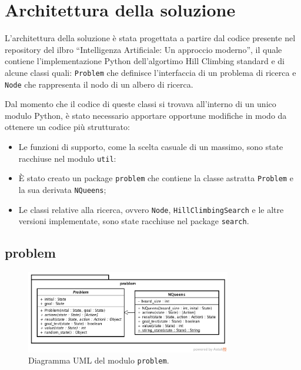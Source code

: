 \clearpage
\section{Architettura della soluzione}

L'architettura della soluzione è stata progettata a partire dal codice presente nel repository del ilbro ``Intelligenza Artificiale: Un approccio moderno'', il quale contiene l'implementazione Python dell'algortimo Hill Climbing standard e di alcune classi quali: \texttt{Problem} che definisce l'interfaccia di un problema di ricerca e \texttt{Node} che rappresenta il nodo di un albero di ricerca.

Dal momento che il codice di queste classi si trovava all'interno di un unico modulo Python, è stato necessario apportare opportune modifiche in modo da ottenere un codice più strutturato:

\begin{itemize}
\item Le funzioni di supporto, come la scelta casuale di un massimo, sono state racchiuse nel modulo \texttt{util}:
\item \`{E} stato creato un package \texttt{problem} che contiene la classe astratta \texttt{Problem} e la sua derivata \texttt{NQueens};
\item Le classi relative alla ricerca, ovvero \texttt{Node}, \texttt{HillClimbingSearch} e le altre versioni implementate, sono state racchiuse nel package \texttt{search}.
\end{itemize}

\subsection{problem}

\begin{figure}[ht]
\centering
\includegraphics[width=0.8\textwidth]{./immagini/problem_uml.png}
\caption{Diagramma UML del modulo \texttt{problem}.}
\label{fig:uml_problem}
\end{figure}

